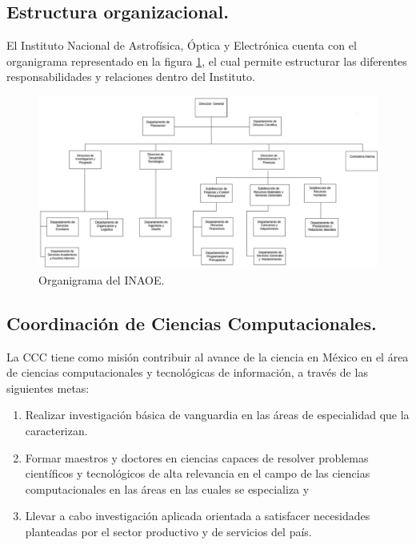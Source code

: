 \subsection{Estructura organizacional.}
El Instituto Nacional de Astrofísica, Óptica y Electrónica cuenta con el organigrama representado en la figura \ref{organigrama}, el cual permite estructurar las diferentes responsabilidades y relaciones dentro del Instituto. 

\begin{figure}[!h]
    \centering
    \includegraphics[width=15cm]{img/organigrama.png}
    \caption{Organigrama del INAOE.}
    \label{organigrama}
\end{figure}

\subsection{Coordinación de Ciencias Computacionales.}

La CCC tiene como misión contribuir al avance de la ciencia en México en el área de ciencias computacionales y tecnológicas de información, a través de las siguientes metas:

\begin{enumerate}
    \item Realizar investigación básica de vanguardia en las áreas de especialidad que la caracterizan.
    \item Formar maestros y doctores en ciencias capaces de resolver problemas científicos y tecnológicos de alta relevancia en el campo de las ciencias computacionales en las áreas en las cuales se especializa y
    \item Llevar a cabo investigación aplicada orientada a satisfacer necesidades planteadas por el sector productivo y de servicios del país.
\end{enumerate}

